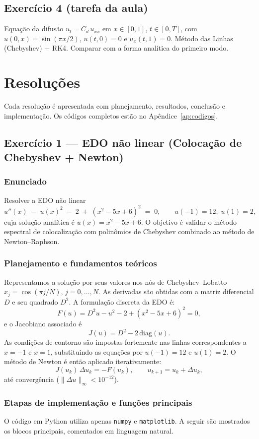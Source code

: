 \documentclass[12pt,a4paper]{article}
\begin{document}
\subsection{Exercício 4 (tarefa da aula)}
Equação da difusão $u_t=C_d\,u_{xx}$ em $x\in[0,1]$, $t\in[0,T]$, com $u(0,x)=\sin(\pi x/2)$, $u(t,0)=0$ e $u_x(t,1)=0$. Método das Linhas (Chebyshev) + RK4. Comparar com a forma analítica do primeiro modo.

\newpage

\section{Resoluções}
Cada resolução é apresentada com planejamento, resultados, conclusão e implementação. Os códigos completos estão no Apêndice~\ref{ap:codigos}.

\subsection{Exercício 1 — EDO não linear (Colocação de Chebyshev + Newton)}

\subsubsection*{Enunciado}
Resolver a EDO não linear
\[
u''(x)\;-\;u(x)^2\;-\;2\;+\;(x^2-5x+6)^2 \;=\;0,\qquad
u(-1)=12,\; u(1)=2,
\]
cuja solução analítica é \(u(x)=x^2-5x+6\).
O objetivo é validar o método espectral de colocalização com polinômios de Chebyshev combinado ao método de Newton–Raphson.

\subsubsection*{Planejamento e fundamentos teóricos}
Representamos a solução por seus valores nos nós de Chebyshev–Lobatto \(x_j=\cos(\pi j/N)\), \(j=0,\ldots,N\).  
As derivadas são obtidas com a matriz diferencial \(D\) e seu quadrado \(D^2\).  
A formulação discreta da EDO é:
\[
F(u)=D^2u - u^2 - 2 + (x^2-5x+6)^2 = 0,
\]
e o Jacobiano associado é
\[
J(u)=D^2 - 2\,\mathrm{diag}(u).
\]
As condições de contorno são impostas fortemente nas linhas correspondentes a \(x=-1\) e \(x=1\), substituindo as equações por \(u(-1)=12\) e \(u(1)=2\).  
O método de Newton é então aplicado iterativamente:
\[
J(u_k)\,\Delta u_k=-F(u_k),\qquad u_{k+1}=u_k+\Delta u_k,
\]
até convergência (\(\|\Delta u\|_\infty<10^{-12}\)).

\subsubsection*{Etapas de implementação e funções principais}
O código em Python utiliza apenas \texttt{numpy} e \texttt{matplotlib}.  
A seguir são mostrados os blocos principais, comentados em linguagem natural.
\end{document}
